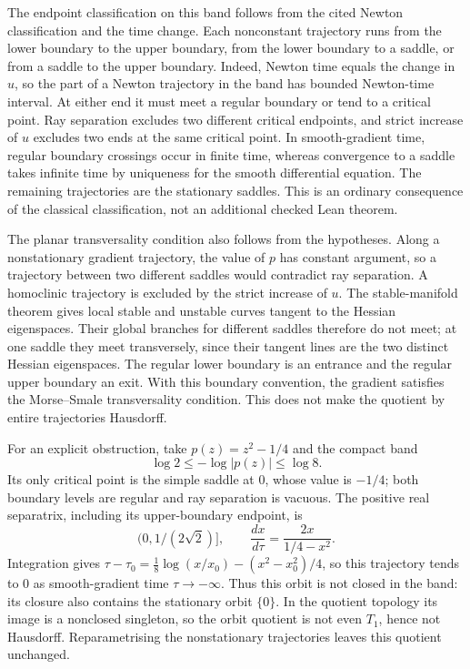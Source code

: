 \documentclass[11pt]{article}
\begin{document}
The endpoint classification on this band follows from the cited Newton
classification and the time change. Each nonconstant trajectory runs
from the lower boundary to the upper boundary, from the lower boundary
to a saddle, or from a saddle to the upper boundary. Indeed, Newton time
equals the change in $u$, so the part of a Newton trajectory in the
band has bounded Newton-time interval. At either end it must meet a
regular boundary or tend to a critical point. Ray separation excludes
two different critical endpoints, and strict increase of $u$ excludes
two ends at the same critical point. In smooth-gradient time, regular
boundary crossings occur in finite time, whereas convergence to a
saddle takes infinite time by uniqueness for the smooth differential
equation. The remaining trajectories are the stationary saddles.
This is an ordinary consequence of the classical classification, not
an additional checked Lean theorem.

The planar transversality condition also follows from the hypotheses.
Along a nonstationary gradient trajectory, the value of $p$ has constant
argument, so a trajectory between two different saddles would contradict
ray separation. A homoclinic trajectory is excluded
by the strict increase of $u$. The stable-manifold theorem gives local
stable and unstable curves tangent to the Hessian eigenspaces. Their
global branches for different saddles therefore do not meet; at one
saddle they meet transversely,
since their tangent lines are the two distinct Hessian eigenspaces.
The regular lower boundary is an entrance and the regular upper boundary
an exit. With this boundary convention, the gradient satisfies the
Morse--Smale transversality condition. This does not make the quotient
by entire trajectories Hausdorff.

For an explicit obstruction, take $p(z)=z^2-1/4$ and the compact band
\[
 \log2\le-\log|p(z)|\le\log8.
\]
Its only critical point is the simple saddle at $0$, whose value is
$-1/4$; both boundary levels are regular and ray separation is vacuous.
The positive real separatrix, including its upper-boundary endpoint, is
\[
 \bigl(0,1/(2\sqrt2)\bigr],\qquad
 \frac{dx}{d\tau}=\frac{2x}{1/4-x^2}.
\]
Integration gives
$\tau-\tau_0=\tfrac18\log(x/x_0)-(x^2-x_0^2)/4$, so this
trajectory tends to $0$ as smooth-gradient time $\tau\to-\infty$.
Thus this orbit is not closed in the band: its closure also contains the
stationary orbit $\{0\}$. In the quotient topology its image is a
nonclosed singleton, so the orbit quotient is not even $T_1$, hence not
Hausdorff. Reparametrising the nonstationary trajectories leaves this
quotient unchanged.
\end{document}
